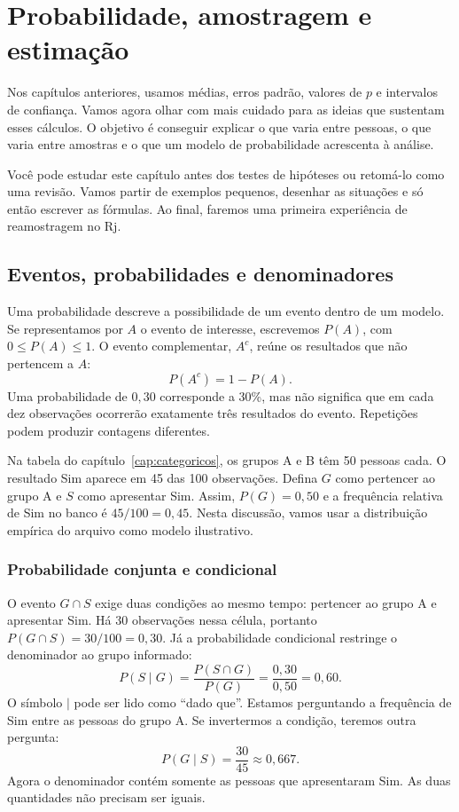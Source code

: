 \chapter{Probabilidade, amostragem e estimação}
\label{cap:probabilidade}

Nos capítulos anteriores, usamos médias, erros padrão, valores de $p$ e intervalos de confiança. Vamos agora olhar com mais cuidado para as ideias que sustentam esses cálculos. O objetivo é conseguir explicar o que varia entre pessoas, o que varia entre amostras e o que um modelo de probabilidade acrescenta à análise.

Você pode estudar este capítulo antes dos testes de hipóteses ou retomá-lo como uma revisão. Vamos partir de exemplos pequenos, desenhar as situações e só então escrever as fórmulas. Ao final, faremos uma primeira experiência de reamostragem no Rj.

\section{Eventos, probabilidades e denominadores}

Uma probabilidade descreve a possibilidade de um evento dentro de um modelo. Se representamos por $A$ o evento de interesse, escrevemos $P(A)$, com $0\leq P(A)\leq1$. O evento complementar, $A^c$, reúne os resultados que não pertencem a $A$:
\[
P(A^c)=1-P(A).
\]
Uma probabilidade de $0{,}30$ corresponde a 30\%, mas não significa que em cada dez observações ocorrerão exatamente três resultados do evento. Repetições podem produzir contagens diferentes.

Na tabela do capítulo~\ref{cap:categoricos}, os grupos A e B têm 50 pessoas cada. O resultado Sim aparece em 45 das 100 observações. Defina $G$ como pertencer ao grupo A e $S$ como apresentar Sim. Assim, $P(G)=0{,}50$ e a frequência relativa de Sim no banco é $45/100=0{,}45$. Nesta discussão, vamos usar a distribuição empírica do arquivo como modelo ilustrativo.

\subsection{Probabilidade conjunta e condicional}

O evento $G\cap S$ exige duas condições ao mesmo tempo: pertencer ao grupo A e apresentar Sim. Há 30 observações nessa célula, portanto $P(G\cap S)=30/100=0{,}30$. Já a probabilidade condicional restringe o denominador ao grupo informado:
\[
P(S\mid G)=\frac{P(S\cap G)}{P(G)}
=\frac{0{,}30}{0{,}50}=0{,}60.
\]
O símbolo $\mid$ pode ser lido como ``dado que''. Estamos perguntando a frequência de Sim entre as pessoas do grupo A. Se invertermos a condição, teremos outra pergunta:
\[
P(G\mid S)=\frac{30}{45}\approx0{,}667.
\]
Agora o denominador contém somente as pessoas que apresentaram Sim. As duas quantidades não precisam ser iguais.


